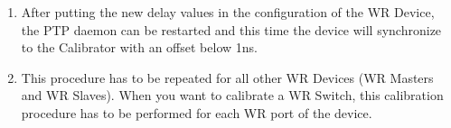 \begin{enumerate}
		{\bf Note:} The asymmetry measured in this stage of calibration is in fact
		the sum of WR Device and WR Calibrator asymmetry. However, since both
		transmission and reception delays are modified with this value, the
		component for WR Calibrator asymmetry will cancel when connecting two WR
		Devices calibrated to the same Calibrator, see \ref{subsec:apx:devices} for
		a mathematical proof.
	\item After putting the new delay values in the configuration of the WR
		Device, the PTP daemon can be restarted and this time the device will
		synchronize to the Calibrator with an offset below 1ns.
	\item This procedure has to be repeated for all other WR Devices (WR Masters
		and WR Slaves). When you want to calibrate a WR Switch, this calibration
		procedure has to be performed for each WR port of the device.
\end{enumerate}
